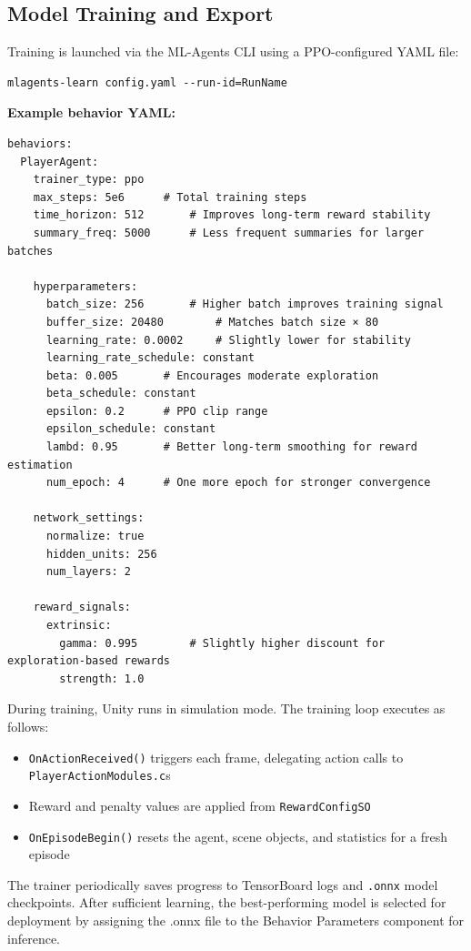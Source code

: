 \documentclass[12pt,oneside,openright,a4paper]{cpe-english-project}
\begin{document}
\subsection{Model Training and Export}

Training is launched via the ML-Agents CLI using a PPO-configured YAML file:

\begin{lstlisting}
mlagents-learn config.yaml --run-id=RunName
\end{lstlisting}

\textbf{Example behavior YAML:}
\begin{lstlisting}
behaviors:
  PlayerAgent:
    trainer_type: ppo
    max_steps: 5e6		# Total training steps
    time_horizon: 512		# Improves long-term reward stability
    summary_freq: 5000		# Less frequent summaries for larger batches

    hyperparameters:
      batch_size: 256		# Higher batch improves training signal
      buffer_size: 20480		# Matches batch size × 80
      learning_rate: 0.0002		# Slightly lower for stability
      learning_rate_schedule: constant
      beta: 0.005		# Encourages moderate exploration
      beta_schedule: constant
      epsilon: 0.2		# PPO clip range
      epsilon_schedule: constant
      lambd: 0.95		# Better long-term smoothing for reward estimation
      num_epoch: 4		# One more epoch for stronger convergence

    network_settings:
      normalize: true
      hidden_units: 256
      num_layers: 2

    reward_signals:
      extrinsic:
        gamma: 0.995		# Slightly higher discount for exploration-based rewards
        strength: 1.0
\end{lstlisting}

During training, Unity runs in simulation mode. The training loop executes as follows:

\begin{itemize}
\item \texttt{OnActionReceived()} triggers each frame, delegating action calls to \texttt{PlayerActionModules.c}s
\item Reward and penalty values are applied from \texttt{RewardConfigSO}
\item \texttt{OnEpisodeBegin()} resets the agent, scene objects, and statistics for a fresh episode
\end{itemize}

The trainer periodically saves progress to TensorBoard logs and \texttt{.onnx} model checkpoints. After sufficient learning, the best-performing model is selected for deployment by assigning the .onnx file to the Behavior Parameters component for inference.
\end{document}
